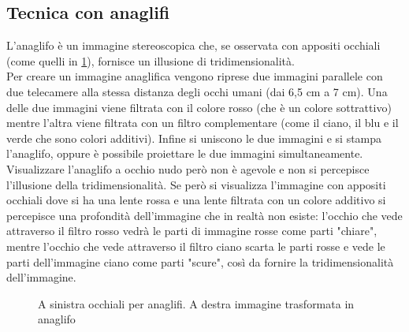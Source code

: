 \documentclass[12pt,a4paper,openright,twoside]{book}
\begin{document}
    \subsection{Tecnica con anaglifi}
    L'anaglifo è un immagine stereoscopica che, se osservata con appositi occhiali (come quelli in \figurename \ref{fig:anagl}), fornisce un illusione di tridimensionalità.\\
    Per creare un immagine anaglifica vengono riprese due immagini parallele con due telecamere alla stessa distanza degli occhi umani (dai 6,5 cm a 7 cm). Una delle due immagini viene filtrata con il colore rosso (che è un colore sottrattivo) mentre l'altra viene filtrata con un filtro complementare (come il ciano, il blu e il verde che sono colori additivi). Infine si uniscono le due immagini e si stampa l'anaglifo, oppure è possibile proiettare le due immagini simultaneamente.\\ Visualizzare l'anaglifo a occhio nudo però non è agevole e non si percepisce l'illusione della tridimensionalità. Se però si visualizza l'immagine con appositi occhiali dove si ha una lente rossa e una lente filtrata con un colore additivo si percepisce una profondità dell'immagine che in realtà non esiste: l'occhio che vede attraverso il filtro rosso vedrà le parti di immagine rosse come parti "chiare", mentre l'occhio che vede attraverso il filtro ciano scarta le parti rosse e vede le parti dell'immagine ciano come parti "scure", così da fornire la tridimensionalità dell'immagine. 
    \begin{figure}[h]
    	\centering
    	  \quad
    	\caption{A sinistra occhiali per anaglifi. A destra immagine trasformata in anaglifo}
    	\label{fig:anagl}
    \end{figure}
\newpage
\end{document}
